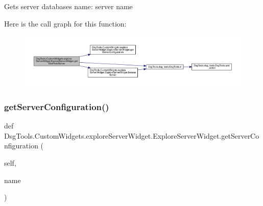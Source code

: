 \begin{DoxyVerb}Gets server databases
name: server name
\end{DoxyVerb}
 Here is the call graph for this function\+:
\nopagebreak
\begin{figure}[H]
\begin{center}
\leavevmode
\includegraphics[width=350pt]{class_dsg_tools_1_1_custom_widgets_1_1explore_server_widget_1_1_explore_server_widget_a7223998ba1769eabac665aa57e992ad6_cgraph}
\end{center}
\end{figure}
\mbox{\label{class_dsg_tools_1_1_custom_widgets_1_1explore_server_widget_1_1_explore_server_widget_ae76906b263b378952f3fd1e967c83482}} 
\subsubsection{\texorpdfstring{get\+Server\+Configuration()}{getServerConfiguration()}}
{\footnotesize\ttfamily def Dsg\+Tools.\+Custom\+Widgets.\+explore\+Server\+Widget.\+Explore\+Server\+Widget.\+get\+Server\+Configuration (\begin{DoxyParamCaption}\item[{}]{self,  }\item[{}]{name }\end{DoxyParamCaption})}


